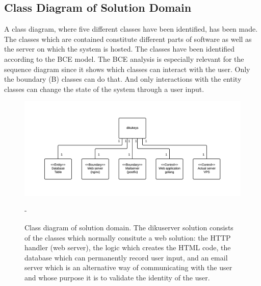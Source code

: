 \documentclass[11pt,a4paper]{report}
\begin{document}
\subsection{Class Diagram of Solution Domain}\label{subsec:class_diagram}
A class diagram, where five different classes have been identified, has been made. The classes which are contained constitute different parts of software as well as the server on which the system is hosted. The classes have been identified according to the BCE model. The BCE analysis is especially relevant for the sequence diagram since it shows which classes can interact with the user. Only the boundary (B) classes can do that. And only interactions with the entity classes can change the state of the system through a user input.
\begin{figure}[H]
    \centering
    \includegraphics[width=1.2\textwidth]{pictures/class_diagram}
    \caption{Class diagram of solution domain. The dikuserver solution consists of the classes which normally consitute a web solution: the HTTP handler (web server), the logic which creates the HTML code, the database which can permanently record user input, and an email server which is an alternative way of communicating with the user and whose purpose it is to validate the identity of the user.}     -    \label{fig:class_diagram}
\end{figure}
\subsection*{}
\end{document}
